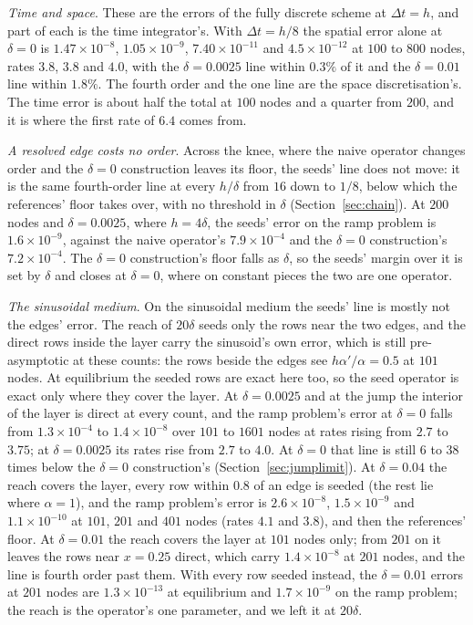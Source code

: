 \documentclass[11pt]{amsart}
\theoremstyle{definition}
\theoremstyle{remark}
\newcommand{\para}[1]{\par\smallskip\noindent\textit{#1}.\enspace}
\newcommand{\sci}[2]{#1 \times 10^{#2}}
\begin{document}
\para{Time and space}
These are the errors of the fully discrete scheme at $\Delta t = h$, and
part of each is the time integrator's. With $\Delta t = h/8$ the spatial
error alone at $\delta = 0$ is $\sci{1.47}{-8}$, $\sci{1.05}{-9}$,
$\sci{7.40}{-11}$ and $\sci{4.5}{-12}$ at $100$ to $800$ nodes, rates
$3.8$, $3.8$ and $4.0$, with the $\delta = 0.0025$ line within $0.3\%$ of
it and the $\delta = 0.01$ line within $1.8\%$. The fourth order and the one
line are the space discretisation's. The time error is about half the total
at $100$ nodes and a quarter from $200$, and it is where the first rate of
$6.4$ comes from.

\para{A resolved edge costs no order}
Across the knee, where the naive operator changes order and the
$\delta = 0$ construction leaves its floor, the seeds' line does not move: it is the same
fourth-order line at every $h / \delta$ from $16$ down to $1/8$, below
which the references' floor takes over, with no threshold in $\delta$
(Section~\ref{sec:chain}). At $200$ nodes and $\delta = 0.0025$, where
$h = 4\delta$, the seeds' error on the ramp problem is $\sci{1.6}{-9}$,
against the naive operator's $\sci{7.9}{-4}$ and the $\delta = 0$ construction's
$\sci{7.2}{-4}$. The $\delta = 0$ construction's floor falls as $\delta$, so the seeds'
margin over it is set by $\delta$ and closes at $\delta = 0$, where on
constant pieces the two are one operator.

\para{The sinusoidal medium}
On the sinusoidal medium the seeds' line is mostly not the edges' error.
The reach of $20\delta$ seeds only the rows near the two edges, and the
direct rows inside the layer carry the sinusoid's own error, which is still
pre-asymptotic at these counts: the rows beside the edges see
$h \alpha' / \alpha = 0.5$ at $101$ nodes. At equilibrium the seeded rows
are exact here too, so the seed operator is exact only where they cover the
layer. At $\delta = 0.0025$ and at the jump the interior of the layer is
direct at every count, and the ramp problem's error at $\delta = 0$ falls
from $\sci{1.3}{-4}$ to $\sci{1.4}{-8}$ over $101$ to $1601$ nodes at rates
rising from $2.7$ to $3.75$; at $\delta = 0.0025$ its rates rise from $2.7$
to $4.0$. At $\delta = 0$ that line is still $6$ to $38$ times below the
$\delta = 0$ construction's (Section~\ref{sec:jumplimit}). At
$\delta = 0.04$ the reach covers the layer, every row within $0.8$ of an
edge is seeded (the rest lie where $\alpha = 1$), and the ramp problem's
error is $\sci{2.6}{-8}$, $\sci{1.5}{-9}$ and $\sci{1.1}{-10}$ at $101$,
$201$ and $401$ nodes (rates $4.1$ and $3.8$), and then the references'
floor. At $\delta = 0.01$ the reach covers the layer at $101$ nodes only;
from $201$ on it leaves the rows near $x = 0.25$ direct, which carry
$\sci{1.4}{-8}$ at $201$ nodes, and the line is fourth order past them.
With every row seeded instead, the $\delta = 0.01$ errors at $201$ nodes
are $\sci{1.3}{-13}$ at equilibrium and $\sci{1.7}{-9}$ on the ramp
problem; the reach is the operator's one parameter, and we left it at
$20\delta$.
\end{document}
